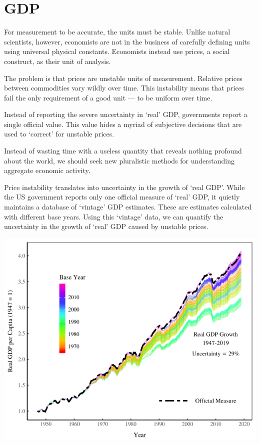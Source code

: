 \documentclass[
]{book}
\begin{document}
\hypertarget{gdp}{%
\section{GDP}\label{gdp}}

For measurement to be accurate, the units must be stable.
Unlike natural scientists, however, economists are not in the business of
carefully defining units using universal physical constants.
Economists instead use prices, a social construct, as their unit of analysis.

The problem is that prices are unstable units of measurement.
Relative prices between commodities vary wildly over time.
This instability means that prices fail the only requirement of a good unit --- to be uniform over time.

Instead of reporting the severe uncertainty in `real' GDP, governments report a single official value.
This value hides a myriad of subjective decisions that are used to `correct' for unstable prices.

Instead of wasting time with a useless quantity that reveals nothing profound about the world,
we should seek new pluralistic methods for understanding aggregate economic activity.

Price instability translates into uncertainty in the growth of `real GDP'. While the US government reports only one official measure of `real' GDP, it quietly maintains a database of `vintage' GDP estimates. These are estimates calculated with different base years. Using this `vintage' data, we can quantify the uncertainty in the growth of `real' GDP caused by unstable prices.

\includegraphics{fig/gdp_uncertainty_baseyear.png}
\end{document}
